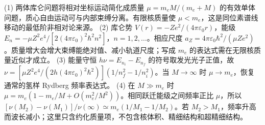 (1) 两体库仑问题将相对坐标运动简化成质量 \(\mu=m_eM/(m_e+M)\) 的有效单体问题，质心自由运动可与内部束缚分离。有限核质量使 \(\mu<m_e\)，这是同位素谱线移动的最低阶非相对论来源。
(2) 库仑势 \(V(r)=-Ze^2/(4\pi\varepsilon_0r)\)，能级 \(E_n=-\mu Z^2e^4/[2(4\pi\varepsilon_0)^2\hbar^2n^2]\)，\(n=1,2,\ldots\)。相应尺度 \(a_Z=4\pi\varepsilon_0\hbar^2/(\mu Ze^2)\)。质量增大会增大束缚能绝对值、减小轨道尺度；写成 \(m_e\) 的表达式需在无限核质量近似才成立。
(3) 能量守恒 \(h\nu=E_{n_i}-E_{n_f}\) 的符号取发光光子正值，故 \(\nu=[\mu Z^2e^4/(2h(4\pi\varepsilon_0)^2\hbar^2)](1/n_f^2-1/n_i^2)\)。当 \(M\to\infty\) 时 \(\mu\to m_e\)，恢复通常的氢样 Rydberg 频率表达式。
(4) 在 \(M\gg m_e\) 时 \(\mu=m_e(1-m_e/M+O(m_e^2/M^2))\)。相同跃迁能级之间频率正比 \(\mu\)，所以 \([\nu(M_2)-\nu(M_1)]/\nu(\infty)\simeq m_e(1/M_1-1/M_2)\)。若 \(M_2>M_1\)，频率升高而波长减小；这里只含约化质量项，不包含核体积、精细结构和超精细结构。
